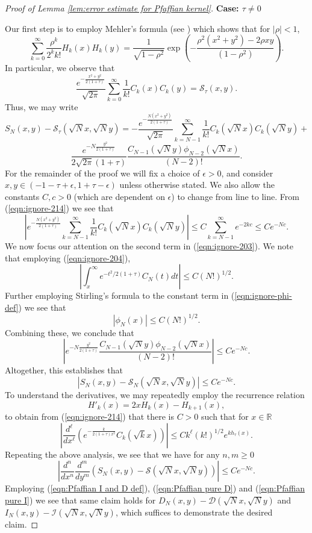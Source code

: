 \documentclass[12pt]{article}
\newcommand{\R}{\mathbb{R}}
\numberwithin{info}{section}
\numberwithin{equation}{section}
\renewcommand{\[}{\begin{equation}}
\renewcommand{\]}{\end{equation}}
\renewcommand{\cal}{\mathcal}
\newcommand{\sq}{\sqrt}
\newcommand{\<}{\langle}
\renewcommand{\>}{\rangle}
\renewcommand{\sq}{\sqrt}
\renewcommand{\l}{\left}
\renewcommand{\r}{\right}
\begin{document}
	\begin{proof}[Proof of Lemma \ref{lem:error estimate for Pfaffian kernel}]
		\textbf{Case: $\tau\neq 0$}
		
		Our first step is to employ Mehler's formula (see \cite{AS}) which shows that for $|\rho|<1$,
		\[\sum_{k=0}^{\infty}\frac{\rho^k}{2^k k!}H_{k}(x)H_k(y)=\frac{1}{\sq{1-\rho^2}}\exp \left(-\frac{\rho^2(x^2+y^2)-2\rho xy}{(1-\rho^2)}\right).\label{eqn:mehler}\]
		In particular, we observe that
		\[\frac{e^{-\frac{x^2+y^2}{2(1+\tau)}}}{\sq{2\pi}}\sum_{k=0}^{\infty}\frac{1}{k!}C_k(x)C_k(y)=\cal{S}_{\tau}(x,y).\]
		Thus, we may write
		\[S_N(x,y)-\cal{S}_{\tau}(\sq{N}x,\sq{N}y)=-\frac{e^{-\frac{N\left(x^2+y^2\right)}{2(1+\tau)}}}{\sq{2\pi}}\sum_{k=N-1}^{\infty}\frac{1}{k!}C_k(\sq{N}x)C_k(\sq{N}y)+\]\[\frac{e^{-N\frac{y^2}{2(1+\tau)}}}{2\sq{2\pi}(1+\tau)}\frac{C_{N-1}(\sq{N}y)\phi_{N-2}(\sq{N}x)}{(N-2)!}.\label{eqn:ignore-203}\]
		For the remainder of the proof we will fix a choice of $\epsilon>0$, and consider $x,y\in (-1-\tau+\epsilon,1+\tau-\epsilon)$ unless otherwise stated. We also allow the constants $C,c>0$ (which are dependent on $\epsilon$) to change from line to line. From (\ref{eqn:ignore-214}) we see that
		\[\l|e^{-\frac{N\left(x^2+y^2\right)}{2(1+\tau)}}\sum_{k=N-1}^{\infty}\frac{1}{k!}C_k(\sq{N}x)C_k(\sq{N}y)\r|\le C\sum_{k=N-1}^{\infty}e^{-2kc}\le Ce^{-Nc}.\]
		We now focus our attention on the second term in (\ref{eqn:ignore-203}). We note that employing (\ref{eqn:ignore-204}),
		\[\left|\int_x^\infty e^{-t^2/2(1+\tau)}C_N(t)dt\right|\le C(N!)^{1/2}.\]
		Further employing Stirling's formula to the constant term in (\ref{eqn:ignore-phi-def}) we see that 
		\[|\phi_N(x)|\le C(N!)^{1/2}. \label{eqn:ignore-215}\] 
		Combining these, we conclude that
		\[\left|e^{-N\frac{y^2}{2(1+\tau)}}\frac{C_{N-1}(\sq{N}y)\phi_{N-2}(\sq{N}x)}{(N-2)!}\right|\le Ce^{-Nc}.\label{eqn:ignore-129823748728}\]
		Altogether, this establishes that
		\[|S_N(x,y)-\cal{S}_N(\sqrt{N}x,\sqrt{N}y)|\le Ce^{-Nc}.\]
		To understand the derivatives, we may repeatedly employ the recurrence relation
		\[H'_k(x)=2xH_k(x)-H_{k+1}(x),\]
		to obtain from (\ref{eqn:ignore-214}) that there is $C>0$ such that for $x\in \R$
		\[\l|\frac{d^\ell}{dx^\ell}\left(e^{-\frac{k}{2(1+\tau)x^2}}C_k(\sq{k}x)\right)\r|\le C k^\ell (k!)^{1/2}e^{k h_\tau(x)}.\]
		Repeating the above analysis, we see that we have for any $n,m\ge 0$
		\[\l|\frac{d^n}{dx^n}\frac{d^m}{dy^m}\left(S_N(x,y)-\cal{S}(\sq{N}x,\sq{N}y)\right)\r|\le Ce^{-Nc}.\]
		Employing (\ref{eqn:Pfaffian I and D def}), (\ref{eqn:Pfaffian pure D}) and (\ref{eqn:Pfaffian pure I}) we see that same claim holds for $D_N(x,y)-\cal{D}(\sq{N}x,\sq{N}y)$ and $I_N(x,y)-\cal{I}(\sq{N}x,\sq{N}y)$, which suffices to demonstrate the desired claim. 
		

\end{proof}
\end{document}
